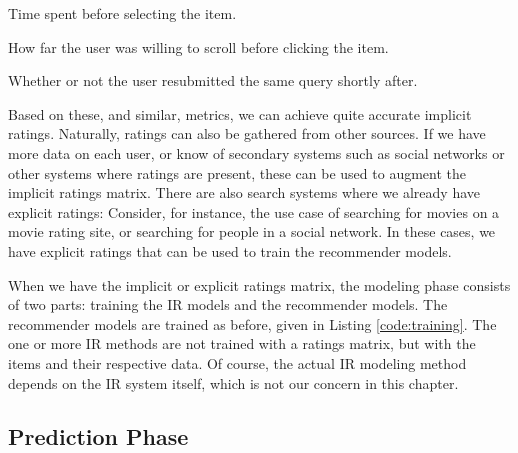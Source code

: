 \begin{itemize*}
  \item Time spent before selecting the item.
  \item How far the user was willing to scroll before clicking the item.
  \item Whether or not the user resubmitted the same query shortly after.
\end{itemize*}

Based on these, and similar, metrics, we can achieve quite accurate implicit ratings.
Naturally, ratings can also be gathered from other sources.
If we have more data on each user, or know of secondary systems such as social networks
or other systems where ratings are present, these can be used to augment the implicit ratings matrix.
There are also search systems where we already have explicit ratings:
Consider, for instance, the use case of searching for movies on a movie rating site,
or searching for people in a social network.
In these cases, we have explicit ratings that can be used to train the recommender models.

When we have the implicit or explicit ratings matrix, the modeling phase
consists of two parts: training the IR models and the recommender models.
The recommender models are trained as before, given in Listing \ref{code:training}.
The one or more IR methods are not trained with a ratings matrix,
but with the items and their respective data.
Of course, the actual IR modeling method depends on the IR system itself,
which is not our concern in this chapter.


\subsection{Prediction Phase}

